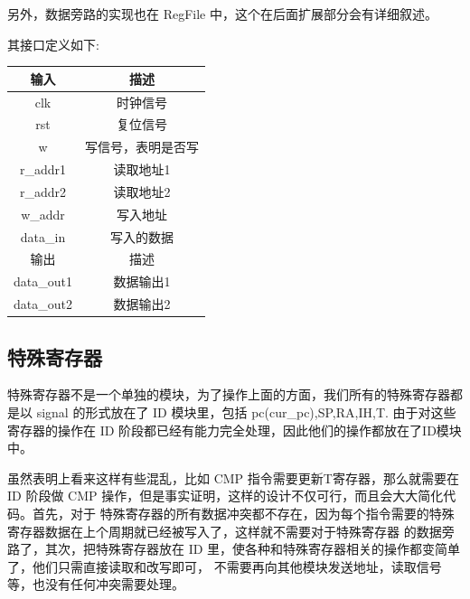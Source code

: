 \documentclass[10pt]{article}
\begin{document}
\begin{CJK}{UTF8}{gbsn}
另外，数据旁路的实现也在 RegFile 中，这个在后面扩展部分会有详细叙述。

其接口定义如下:\\
\begin{center}
\begin{tabular}{|c|c|}\hline
输入&描述\\\hline
clk&时钟信号\\\hline
rst&复位信号\\\hline
w&写信号，表明是否写\\\hline
r\_addr1&读取地址1\\\hline
r\_addr2&读取地址2\\\hline
w\_addr&写入地址\\\hline
data\_in&写入的数据\\\hline\hline
输出&描述\\\hline
data\_out1&数据输出1\\\hline
data\_out2&数据输出2\\\hline
\end{tabular}
\end{center}

\subsection{特殊寄存器}
特殊寄存器不是一个单独的模块，为了操作上面的方面，我们所有的特殊寄存器都是以 signal 的形式放在了 ID 模块里，包括
pc(cur\_pc),SP,RA,IH,T.
由于对这些寄存器的操作在 ID 阶段都已经有能力完全处理，因此他们的操作都放在了ID模块中。

虽然表明上看来这样有些混乱，比如
CMP 指令需要更新T寄存器，那么就需要在 ID 阶段做 CMP 操作，但是事实证明，这样的设计不仅可行，而且会大大简化代码。首先，对于
特殊寄存器的所有数据冲突都不存在，因为每个指令需要的特殊寄存器数据在上个周期就已经被写入了，这样就不需要对于特殊寄存器
的数据旁路了，其次，把特殊寄存器放在 ID 里，使各种和特殊寄存器相关的操作都变简单了，他们只需直接读取和改写即可，
不需要再向其他模块发送地址，读取信号等，也没有任何冲突需要处理。


\end{CJK}
\end{document}
